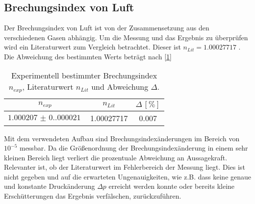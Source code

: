 \subsection{Brechungsindex von Luft}
Der Brechungsindex von Luft ist von der Zusammensetzung aus den verschiedenen Gasen abhängig. Um die Messung und das Ergebnis zu überprüfen wird
ein Literaturwert zum Vergleich betrachtet. Dieser ist $n_{Lit} = 1.00027717$ \cite{n_luft}. Die Abweichung des bestimmten Werts beträgt nach \autoref{1}
\begin{table}[H]
    \centering
    \caption{Experimentell bestimmter Brechungsindex $n_{exp}$, Literaturwert $n_{Lit}$ und Abweichung $\Delta$.}
    \begin{tabular}{c c c}
        \toprule
        $n_{exp}$ & $n_{Lit}$ & $\Delta\,[\unit{\%}]$\\
        \midrule
        $\SI{1.000207(0.000021)}{}$ & 1.00027717 & 0.007\\
        \bottomrule
    \end{tabular}
    \label{tab:abw1}
\end{table}
Mit dem verwendeten Aufbau sind Brechungsindexänderungen im Bereich von $10^{-5}$ messbar. Da die Größenordnung der Brechungsindexänderung in einem sehr kleinen Bereich
liegt verliert die prozentuale Abweichung an Aussagekraft. Relevanter ist, ob der Literaturwert im Fehlerbereich der Messung liegt. 
Dies ist nicht gegeben und auf die erwarteten Ungenauigkeiten, wie z.B. dass keine genaue und konstante Druckänderung $\Delta p$ erreicht werden konnte oder bereits kleine
Erschütterungen das Ergebnis verfälschen, zurückzuführen.
